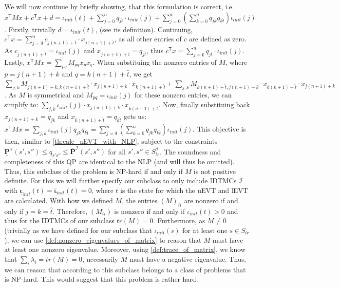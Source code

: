 \documentclass[journal,compsoc,10pt]{IEEEtran}
\newcommand{\IMC}{\mathcal{I}} %
\newcommand{\PFupper}{\mathbf{\overline{P}}}
\newcommand{\PFlower}{\mathbf{\underline{P}}}
\newcommand{\Initupper}{\mathbf{\overline{\iota}}_{init}}
\newcommand{\Initlower}{\mathbf{\underline{\iota}}_{init}}
\newcommand{\T}{\mathsf{T}}            %
\begin{document}
We will now continue by briefly showing, that this formulation is correct, i.e. $x^\T M x + c^\T x +d = \iota_{init}(t)+\sum_{j=0}^n q_{j\hat{t}}\cdot \iota_{init}(j) + \sum_{j=0}^n (\sum_{k=0}^n q_{jk}q_{k\hat{t}})\iota_{init}(j)$. Firstly, trivially $d=\iota_{init}(t)$, (see its definition). Continuing, $c^\T x = \sum_{j=0}^n c_{j(n+1)+\hat{t}}\cdot x_{j(n+1)+\hat{t}}$, as all other entries of $c$ are defined as zero. As $c_{j(n+1)+\hat{t}} = \iota_{init}(j)$ and $x_{j(n+1)+\hat{t}} = q_{j\hat{t}}$, thus $c^\T x = \sum_{j=0}^n q_{j\hat{t}}\cdot \iota_{init}(j)$. Lastly, $x^\T M x = \sum_{pq} M_{pq} x_p x_q$. When substituing the nonzero entries of $M$, where $p=j(n+1)+k$ and $q=k(n+1)+\hat{t}$, we get $\sum_{j,k}M_{j(n+1)+k,k(n+1)+\hat{t}}\cdot x_{j(n+1)+k}\cdot x_{k(n+1)+\hat{t}} + \sum_{j,k}M_{k(n+1)+\hat{t},j(n+1)+k}\cdot x_{k(n+1)+\hat{t}}\cdot x_{j(n+1)+k}$. As $M$ is symmetrical and $M_{pq} = \iota_{init}(j)$ for these nonzero entries, we can simplify to: $\sum_{j,k}\iota_{init}(j)\cdot x_{j(n+1)+k}\cdot x_{k(n+1)+\hat{t}}$. Now, finally substituing back $x_{j(n+1)+k}=q_{jk}$ and $x_{k(n+1)+\hat{t}}=q_{k\hat{t}}$ gets us: $x^\T M x = \sum_{j,k}\iota_{init}(j)q_{jk}q_{k\hat{t}}=\sum_{j=0}^n (\sum_{k=0}^n q_{jk}q_{k\hat{t}})\iota_{init}(j)$.
This objective is then, similar to \cref{th:calc_uEVT_with_NLP}, subject to the constraints $\PFlower^\IMC(s',s'') \leq q_{s's''} \leq \PFupper^\IMC(s',s'')$ for all $s',s''\in S_{tr}^\IMC$. The soundness and completeness of this QP are identical to the NLP (and will thus be omitted). Thus, this subclass of the problem is NP-hard if and only if $M$ is not positive definite. For this we will further specify our subclass to only include IDTMCs $\IMC$ with $\Initlower(t) = \Initupper(t) = 0$, where $t$ is the state for which the uEVT and lEVT are calculated. With how we defined $M$, the entries $(M)_{ii}$ are nonzero if and only if $j=k=\hat{t}$. Therefore, $(M_{ii})$ is nonzero if and only if $\iota_{init}(t)>0$ and thus for the IDTMCs of our subclass $tr(M) = 0$. Furthermore, as $M\neq 0$ (trivially as we have defined for our subclass that $\iota_{init}(s)$ for at least one $s\in S_{tr}$), we can use \cref{def:nonzero_eigenvalues_of_matrix} to reason that $M$ must have at least one nonzero eigenvalue. Moreover, using \cref{def:trace_of_matrix}, we know that $\sum_i \lambda_i= tr(M) = 0$, necessarily $M$ must have a negative eigenvalue. Thus, we can reason that according to \cite{QuadraticP_Pardalos} this subclass belongs to a class of problems that is NP-hard. This would suggest that this problem is rather hard.
\end{document}
